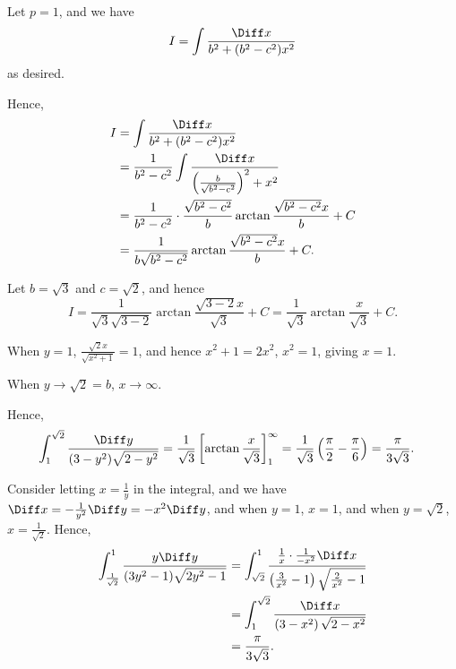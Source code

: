 \begin{enumerate}
          Let \(p = 1\), and we have
          \[
              I = \int \frac{\Diff x}{b^2 + (b^2 - c^2)x^2}
          \]
          as desired.

          Hence,
          \begin{align*}
              I & = \int \frac{\Diff x}{b^2 + (b^2 - c^2)x^2}                                                    \\
                & = \frac{1}{b^2 - c^2} \int \frac{\Diff x}{\left(\frac{b}{\sqrt{b^2 - c^2}}\right)^2 + x^2}     \\
                & = \frac{1}{b^2 - c^2} \cdot \frac{\sqrt{b^2 - c^2}}{b} \arctan \frac{\sqrt{b^2 - c^2}x}{b} + C \\
                & = \frac{1}{b \sqrt{b^2 - c^2}} \arctan \frac{\sqrt{b^2 - c^2}x}{b} + C.
          \end{align*}

          Let \(b = \sqrt{3}\) and \(c = \sqrt{2}\), and hence
          \[
              I = \frac{1}{\sqrt{3} \sqrt{3 - 2}} \arctan \frac{\sqrt{3 - 2}x}{\sqrt{3}} + C = \frac{1}{\sqrt{3}} \arctan \frac{x}{\sqrt{3}} + C.
          \]

          When \(y = 1\), \(\frac{\sqrt{2} x}{\sqrt{x^2 + 1}} = 1\), and hence \(x^2 + 1 = 2x^2\), \(x^2 = 1\), giving \(x = 1\).

          When \(y \to \sqrt{2} = b\), \(x \to \infty\).

          Hence,
          \begin{align*}
              \int_{1}^{\sqrt{2}} \frac{\Diff y}{(3 - y^2) \sqrt{2 - y^2}} & = \frac{1}{\sqrt{3}} \left[\arctan \frac{x}{\sqrt{3}}\right]_{1}^{\infty} = \frac{1}{\sqrt{3}} \left(\frac{\pi}{2} - \frac{\pi}{6}\right) = \frac{\pi}{3\sqrt{3}}.
          \end{align*}

          Consider letting \(x = \frac{1}{y}\) in the integral, and we have \(\Diff x = -\frac{1}{y^2} \Diff y = -x^2 \Diff y\), and when \(y = 1\), \(x = 1\), and when \(y = \sqrt{2}\), \(x = \frac{1}{\sqrt{2}}\). Hence,
          \begin{align*}
              \int_{\frac{1}{\sqrt{2}}}^{1} \frac{y \Diff y}{(3y^2 - 1)\sqrt{2 y^2 - 1}} & = \int_{\sqrt{2}}^{1} \frac{\frac{1}{x} \cdot \frac{1}{-x^2} \Diff x}{\left(\frac{3}{x^2} - 1\right) \sqrt{\frac{2}{x^2} - 1}} \\
                                                                                         & = \int_{1}^{\sqrt{2}} \frac{\Diff x}{\left(3 - x^2\right)\sqrt{2 - x^2}}                                                       \\
                                                                                         & = \frac{\pi}{3\sqrt{3}}.
          \end{align*}


\end{enumerate}
